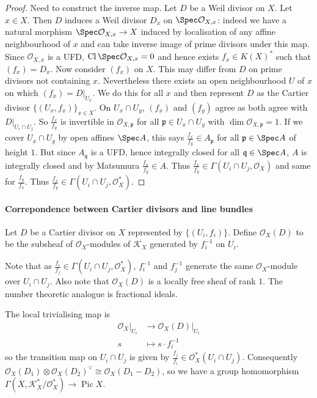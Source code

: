 \documentclass[a4paper]{article}
\newcommand{\sh}[1]{\mathcal{#1}} %
\DeclareMathOperator{\Pic}{Pic} %
\DeclareMathOperator{\Cl}{Cl} %
\begin{document}
\begin{proof}
  Need to construct the inverse map. Let \(D\) be a Weil divisor on \(X\). Let \(x \in X\). Then \(D\) induces a Weil divisor \(D_x\) on \(\Spec \sh O_{X, x}\): indeed we have a natural morphism \(\Spec \sh O_{X, x} \to X\) induced by localisation of any affine neighbourhood of \(x\) and can take inverse image of prime divisors under this map. Since \(\sh O_{X, x}\) is a UFD, \(\Cl \Spec \sh O_{X, x} = 0\) and hence exists \(f_x \in K(X)^*\) such that \((f_x) = D_x\). Now consider \((f_x)\) on \(X\). This may differ from \(D\) on prime divisors not containing \(x\). Nevertheless there exists an open neighbourhood \(U\) of \(x\) on which \((f_x) = D|_{U_x}\). We do this for all \(x\) and then represent \(D\) as the Cartier divisor \(\{(U_x, f_x)\}_{x \in X}\). On \(U_x \cap U_y\), \((f_x)\) and \((f_y)\) agree as both agree with \(D|_{U_i \cap U_j}\). So \(\frac{f_x}{f_y}\) is invertible in \(\sh O_{X, \mathfrak p}\) for all \(\mathfrak p \in U_x \cap U_y\) with \(\dim \sh O_{X, \mathfrak p} = 1\). If we cover \(U_x \cap U_y\) by open affines \(\Spec A\), this says \(\frac{f_x}{f_y} \in A_{\mathfrak p}\) for all \(\mathfrak p \in \Spec A\) of height \(1\). But since \(A_{\mathfrak q}\) is a UFD, hence integrally closed for all \(\mathfrak q \in \Spec A\), \(A\) is integrally closed and by Matsumura \(\frac{f_x}{f_y} \in A\). Thus \(\frac{f_x}{f_y} \in \Gamma(U_i \cap U_j, \sh O_X)\) and same for \(\frac{f_y}{f_x}\). Thus \(\frac{f_x}{f_y} \in \Gamma(U_i \cap U_j, \sh O_X^*)\).
\end{proof}

\paragraph{Correpondence between Cartier divisors and line bundles}

\begin{definition}
  Let \(D\) be a Cartier divisor on \(X\) represented by \(\{(U_i, f_i)\}\). Define \(\sh O_X(D)\) to be the subsheaf of \(\sh O_X\)-modules of \(\sh K_X\) generated by \(f_i^{-1}\) on \(U_i\).
\end{definition}

Note that as \(\frac{f_i}{f_j} \in \Gamma(U_i \cap U_j, \sh O_X^*)\), \(f_i^{-1}\) and \(f_j^{-1}\) generate the same \(\sh O_X\)-module over \(U_i \cap U_j\). Also note that \(\sh O_X(D)\) is a locally free sheaf of rank \(1\). The number theoretic analogue is fractional ideals.

\begin{remark}
  The local trivialising map is
  \begin{align*}
    \sh O_X|_{U_i} &\to \sh O_X(D)|_{U_i} \\
    s &\mapsto s \cdot f_i^{-1}
  \end{align*}
  so the transition map on \(U_i \cap U_j\) is given by \(\frac{f_j}{f_i} \in \sh O_X^*(U_i \cap U_j)\). Consequently \(\sh O_X(D_1) \otimes \sh O_X(D_2)^\vee \cong \sh O_X(D_1 - D_2)\), so we have a group homomorphism \(\Gamma(X, \sh K_X^*/\sh O_X^*) \to \Pic X\).
\end{remark}
\end{document}
